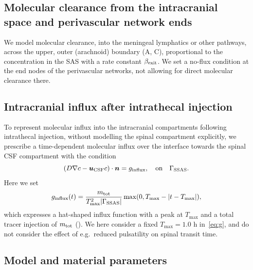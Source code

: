 \documentclass[fleqn,10pt]{wlscirep}
\begin{document}
\subsection*{Molecular clearance from the intracranial space and perivascular network ends}

We model molecular clearance, into the meningeal lymphatics or other
pathways, across the upper, outer (arachnoid) boundary
(A, C), proportional to the
concentration in the SAS with a rate constant $\beta_{\rm exit}$. We
set a no-flux condition at the end nodes of the perivascular networks,
not allowing for direct molecular clearance there.

\subsection*{Intracranial influx after intrathecal injection}
To represent molecular influx into the intracranial compartments
following intrathecal injection, without modelling the spinal
compartment explicitly, we prescribe a time-dependent molecular influx
over the interface towards the spinal CSF compartment with the condition
\begin{equation*}
  (D \nabla c - \bm u_{\rm CSF} c ) \cdot \bm{n} = g_{\mathrm{influx}},  \quad \mathrm{on}  \quad \Gamma_{\mathrm{SSAS}}.
\end{equation*}
Here we set
\begin{equation}
  g_\mathrm{influx}(t) = \frac{m_{\rm tot}}{T_{\rm max}^2 |\Gamma_{\rm SSAS}|} \max(0, T_{\rm max} - |t - T_{\rm max}|), 
  \label{eq:g}
\end{equation}
which expresses a hat-shaped influx function with a peak at $T_{\max}$ and a total tracer injection of $m_{\rm tot}$ (). We here consider a fixed $T_{\max} = 1.0$ h in~\eqref{eq:g}, and do not consider the effect of e.g.~reduced pulsatility on spinal transit time.

\subsection*{Model and material parameters}
\end{document}
